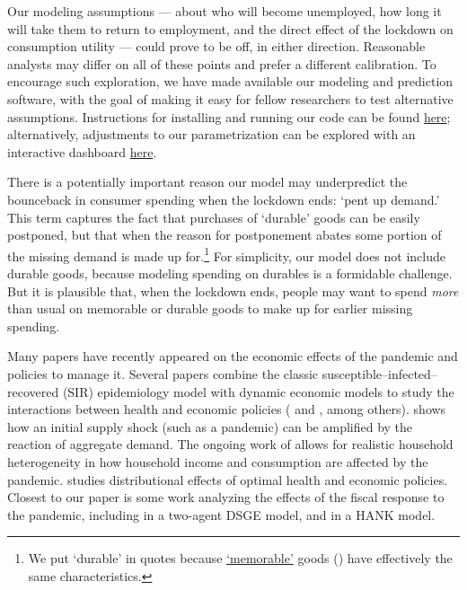 \documentclass[titlepage,letterpaper]{\econtex}
\begin{document}
Our modeling assumptions --- about who will become unemployed, how long it will take them to return to employment, and the direct effect of the lockdown on consumption utility --- could prove to be off, in either direction.
Reasonable analysts may differ on all of these points and prefer a different calibration.
To encourage such exploration, we have made available our modeling and prediction software, with the goal of making it easy for fellow researchers to test alternative assumptions.
Instructions for installing and running our code can be found \href{https://github.com/econ-ark/Pandemic#reproduction-instructions}{here}; alternatively, adjustments to our parametrization can be explored with an interactive dashboard \href{http://econ-ark.org/pandemicdashboard}{here}.

There is a potentially important reason our model may underpredict the bounceback in consumer spending when the lockdown ends: `pent up demand.'
This term captures the fact that purchases of `durable' goods can be easily postponed, but that when the reason for postponement abates some portion of the missing demand is made up for.\footnote{We put `durable' in quotes because \href{https://www.nber.org/papers/w19386}{`memorable'} goods (\cite{hkpMemory}) have effectively the same characteristics.}
For simplicity, our model does not include durable goods, because modeling spending on durables is a formidable challenge.
But it is plausible that, when the lockdown ends, people may want to spend \textit{more} than usual on memorable or durable goods to make up for earlier missing spending.



Many papers have recently appeared on the economic effects of the pandemic and policies to manage it.
Several papers combine the classic susceptible--infected--recovered (SIR) epidemiology model with dynamic economic models to study the interactions between health and economic policies (\cite{ert_covid} and \cite{aal_covid}, among others).
\cite{covidMacroImpl} shows how an initial supply shock (such as a pandemic) can be amplified by the reaction of aggregate demand.
The ongoing work of \cite{kmv_pandemics} allows for realistic household heterogeneity in how household income and consumption are affected by the pandemic.
\cite{healthWealth} studies distributional effects of optimal health and economic policies.
Closest to our paper is some work analyzing the effects of the fiscal response to the pandemic, including \cite{faria_FPpandemic} in a two-agent DSGE model, and \cite{bayer_corona} in a HANK model.
\end{document}
